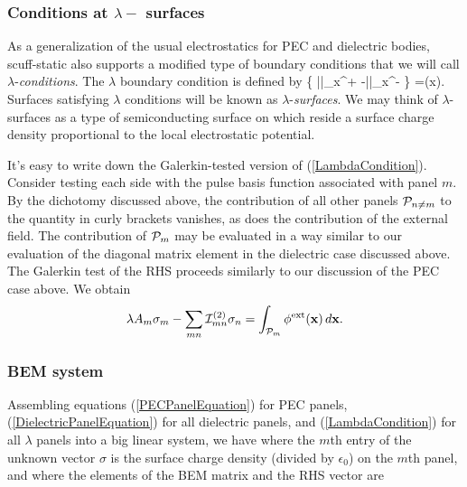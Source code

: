 \documentclass[letterpaper]{article}
\begin{document}
\subsubsection*{Conditions at $\lambda-$ surfaces}

As a generalization of the usual electrostatics
for PEC and dielectric bodies, {\sc scuff-static} 
also supports a modified type of boundary conditions
that we will call $\lambda$-\textit{conditions}.
The $\lambda$ boundary condition is defined by
{
  \lambda\bigg\{
    \left|\right|_{\vb x^+} 
   -\left|\right|_{\vb x^-} 
          \bigg\}
   =\phi(\vb x).
}
Surfaces satisfying $\lambda$ conditions will be 
known as $\lambda$-\textit{surfaces}. We may think 
of $\lambda$-surfaces as a type of semiconducting
surface on which reside a surface charge density
proportional to the local electrostatic potential.

It's easy to write down the Galerkin-tested version
of (\ref{LambdaCondition}). Consider testing each
side with the pulse basis function associated with
panel $m$. By the dichotomy discussed above, the 
contribution of all other panels $\mathcal{P}_{n\ne m}$ to 
the quantity in curly brackets vanishes, as does the 
contribution of the external field. The contribution
of $\mathcal{P}_m$ may be evaluated in a way similar
to our evaluation of the diagonal matrix element
in the dielectric case discussed above. The Galerkin
test of the RHS proceeds similarly to our discussion
of the PEC case above. We obtain
$$ \lambda A_m \sigma_m - \sum_{mn} \mathcal{I}_{mn}^{(2)} \sigma_{n}
   =\int_{\mathcal{P}_m} \phi^{\hbox{\scriptsize{ext}}}(\mathbf{x})\,d\mathbf{x}.
$$


\subsubsection*{BEM system}

Assembling equations (\ref{PECPanelEquation}) for PEC panels,
(\ref{DielectricPanelEquation}) for all dielectric panels,
and (\ref{LambdaCondition}) for all $\lambda$ panels 
into a big linear system, we have 
where the $m$th entry of the unknown vector $\sigma$ is the 
surface charge density (divided by $\epsilon_0$) on the $m$th
panel, and where the elements of the BEM matrix and the RHS vector are
\end{document}
